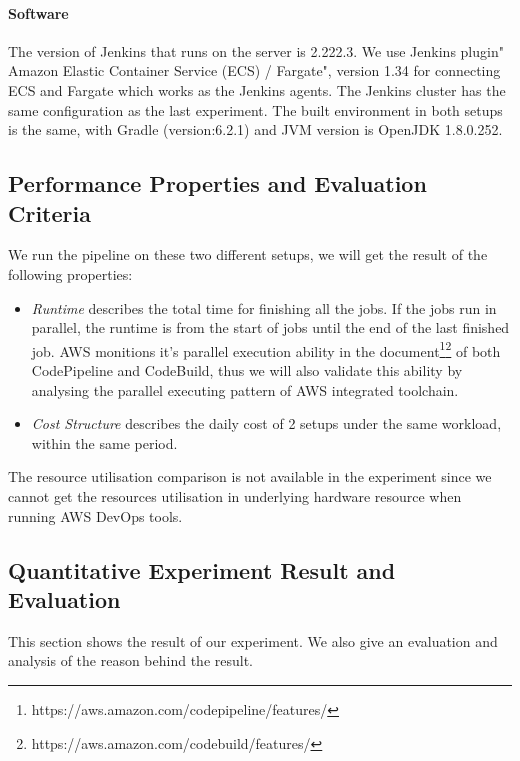 \paragraph{Software}
The version of Jenkins that runs on the server is 2.222.3. We use Jenkins plugin" Amazon Elastic Container Service (ECS) / Fargate", version 1.34 for connecting ECS and Fargate which works as the Jenkins agents. The Jenkins cluster has the same configuration as the last experiment. The built environment in both setups is the same, with Gradle (version:6.2.1) and JVM version is OpenJDK 1.8.0.252.
\subsection{Performance Properties and Evaluation Criteria}
We run the pipeline on these two different setups, we will get the result of the following properties:
\begin{itemize}
\item \textit{Runtime} describes the total time for finishing all the jobs. If the jobs run in parallel, the runtime is from the start of jobs until the end of the last finished job. AWS monitions it's parallel execution ability in the document\footnote{https://aws.amazon.com/codepipeline/features/}\footnote{https://aws.amazon.com/codebuild/features/} of both CodePipeline and CodeBuild, thus we will also validate this ability by analysing the parallel executing pattern of AWS integrated toolchain. \label{aws_parallel}
\item \textit{Cost Structure} describes the daily cost of 2 setups under the same workload, within the same period.
\end{itemize}
The resource utilisation comparison is not available in the experiment since we cannot get the resources utilisation in underlying hardware resource when running AWS DevOps tools.
\subsection{Quantitative Experiment Result and Evaluation}
This section shows the result of our experiment. We also give an evaluation and analysis of the reason behind the result.
